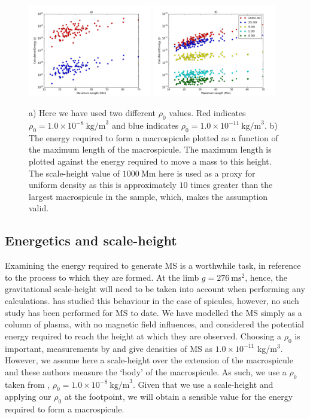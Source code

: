 \begin{figure}[h!]
	\centering
	\includegraphics[width=0.48\textwidth]{Chapter3/Figs/diff_rho0.pdf}
	\includegraphics[width=0.48\textwidth]{Chapter3/Figs/scale_h.pdf}
	\caption{\small a) Here we have used two different $\rho_0$ values. Red indicates $\rho_0 = 1.0 \times 10^{-8}\ \textrm{kg/m}^{3}$ and blue indicates $\rho_0 = 1.0 \times 10^{-11}\ \textrm{kg/m}^{3}$. b) The energy required to form a macrospicule plotted as a function of the maximum length of the macrospicule. The maximum length is plotted against the energy required to move a mass to this height. The scale-height value of $1000\ \textrm{Mm}$ here is used as a proxy for uniform density as this is approximately $10$ times greater than the largest macrospicule in the sample, which, makes the assumption valid.}
	\label{fig:scale_h}
\end{figure}

\subsection{Energetics and scale-height}
Examining the energy required to generate MS is a worthwhile task, in reference to the process to which they are formed. At the limb $g = 276\ \textrm{ms}^2$, hence, the gravitational scale-height will need to be taken into account when performing any calculations. \cite{Pereira2012} has studied this behaviour in the case of spicules, however, no such study has been performed for MS to date. We have modelled the MS simply as a column of plasma, with no magnetic field influences, and considered the potential energy required to reach the height at which they are observed. Choosing a $\rho_0$ is important, measurements by \cite{Parenti2002} and \cite{Withbroe1976} give densities of MS as $1.0 \times 10^{-11}$ kg/m$^{3}$. However, we assume here a scale-height over the extension of the macrospicule and these authors measure the `body' of the macrospicule. As such, we use a $\rho_0$ taken from \cite{Vernazza1981}, $\rho_0 = 1.0 \times 10^{-8}\ \textrm{kg/m}^{3}$. Given that we use a scale-height and applying our $\rho_0$ at the footpoint, we will obtain a sensible value for the energy required to form a macrospicule.

